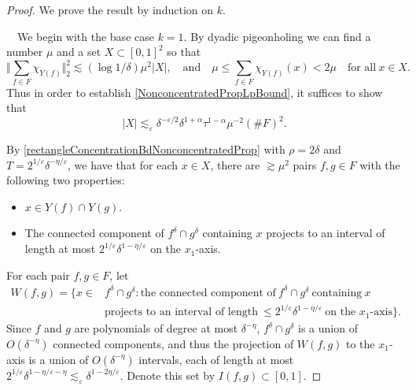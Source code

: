 \documentclass[letterpaper, reqno,11pt]{article}
\numberwithin{equation}{section}
\newcommand{\eps}{\varepsilon}
\numberwithin{thm}{section}
\theoremstyle{remark}
\begin{document}
\begin{proof}
We prove the result by induction on $k$. 

\medskip

\ \ We begin with the base case $k=1$. By dyadic pigeonholing we can find a number $\mu$ and a set $X\subset[0,1]^2$ so that
\[
\Big \Vert \sum_{f\in F}\chi_{Y(f)}\Big\Vert_2^2\lesssim (\log 1/\delta) \mu^2|X|, \quad\textrm{and}\quad \mu\leq \sum_{f\in F}\chi_{Y(f)}(x)< 2\mu\quad\textrm{for all}\ x\in X.
\]
%
Thus in order to establish \eqref{NonconcentratedPropLpBound}, it suffices to show that
\begin{equation}\label{boundOnSizeOfX}
|X| \lesssim_\eps \delta^{-\eps/2}\delta^{1+\alpha}\tau^{1-\alpha}\mu^{-2}(\#F)^2.
\end{equation}


By \eqref{rectangleConcentrationBdNonconcentratedProp} with $\rho=2\delta$ and $T=2^{1/\eps}\delta^{-\eta/\eps}$, we have that for each $x\in X$, there are $\gtrsim\mu^2$ pairs $f,g\in F$ with the following two properties:
\begin{itemize}
\item[(i)] $x\in Y(f)\cap Y(g)$.
\item[(ii)] The connected component of $f^\delta\cap g^\delta$ containing $x$ projects to an interval of length at most $2^{1/\eps}\delta^{1-\eta/\eps}$ on the $x_1$-axis.
\end{itemize} 
For each pair $f,g\in F$, let 
\begin{equation*}
\begin{split}
W(f,g) = \{x\in & f^\delta\cap g^\delta\colon  \textrm{the connected component of}\ f^\delta\cap g^\delta\ \textrm{containing}\ x \\
& \textrm{projects to an interval of length}\ \leq 2^{1/\eps}\delta^{1-\eta/\eps}\ \textrm{on the $x_1$-axis}\}.
\end{split}
\end{equation*}
Since $f$ and $g$ are polynomials of degree at most $\delta^{-\eta}$, $f^\delta\cap g^\delta$ is a union of $O(\delta^{-\eta})$ connected components, and thus the projection of $W(f,g)$ to the $x_1$-axis is a union of $O(\delta^{-\eta})$ intervals, each of length at most $2^{1/\eps}\delta^{1-\eta/\eps-\eta}\lesssim_\eps \delta^{1-2\eta/\eps}$. Denote this set by $I(f,g)\subset[0,1]$.


\end{proof}
\end{document}
